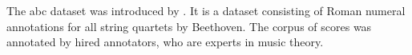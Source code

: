 
The \gls{abc} dataset was introduced by
\textcite{neuwirth2018annotated}. It is a dataset consisting
of Roman numeral annotations for all string quartets by
Beethoven. The corpus of scores was annotated by hired
annotators, who are experts in music theory. 
